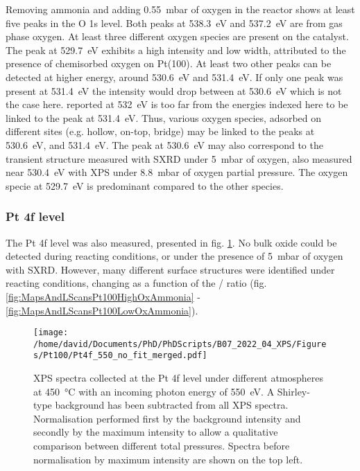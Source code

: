 Removing ammonia and adding \qty{0.55}{\milli\bar} of oxygen in the reactor shows at least five peaks in the O 1s level.
Both peaks at \qty{538.3}{\eV} and \qty{537.2}{\eV} are from gas phase oxygen.
At least three different oxygen species are present on the catalyst.
The peak at \qty{529.7}{\eV} exhibits a high intensity and low width, attributed to the presence of chemisorbed oxygen on Pt(100).
At least two other peaks can be detected at higher energy, around \qty{530.6}{\eV} and \qty{531.4}{\eV}.
If only one peak was present at \qty{531.4}{\eV} the intensity would drop between at \qty{530.6}{\eV} which is not the case here.
 reported at \qty{532}{\eV} \parencite{Kondratenko2006} is too far from the energies indexed here to be linked to the peak at \qty{531.4}{\eV}.
Thus, various oxygen species, adsorbed on different sites (e.g. hollow, on-top, bridge) may be linked to the peaks at \qty{530.6}{\eV}, and \qty{531.4}{\eV}.
The peak at \qty{530.6}{\eV} may also correspond to the transient structure measured with SXRD under \qty{5}{\milli\bar} of oxygen, also measured near \qty{530.4}{\eV} with XPS under \qty{8.8}{\milli\bar} of oxygen partial pressure.
The oxygen specie at \qty{529.7}{\eV} is predominant compared to the other species.

\subsubsection{Pt 4f level}

The Pt 4f level was also measured, presented in fig. \ref{fig:Pt4fPt100}.
No bulk oxide could be detected during reacting conditions, or under the presence of \qty{5}{\milli\bar} of oxygen with SXRD.
However, many different surface structures were identified under reacting conditions, changing as a function of the / ratio (fig. \ref{fig:MapsAndLScansPt100HighOxAmmonia} - \ref{fig:MapsAndLScansPt100LowOxAmmonia}).

\begin{figure}[!htb]
    \centering
    \texttt{[image: /home/david/Documents/PhD/PhDScripts/B07\_2022\_04\_XPS/Figures/Pt100/Pt4f\_550\_no\_fit\_merged.pdf]}
    \caption{
        XPS spectra collected at the Pt 4f level under different atmospheres at \qty{450}{\degreeCelsius} with an incoming photon energy of \qty{550}{\eV}.
        A Shirley-type background has been subtracted from all XPS spectra.
        Normalisation performed first by the background intensity and secondly by the maximum intensity to allow a qualitative comparison between different total pressures.
        Spectra before normalisation by maximum intensity are shown on the top left.
    }
    \label{fig:Pt4fPt100}
\end{figure}

